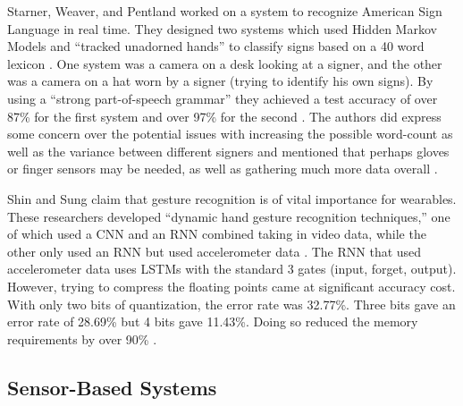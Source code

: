 \documentclass[]{report}
\begin{document}
Starner, Weaver, and Pentland worked on a system to recognize American Sign Language in real time. They designed two systems which used Hidden Markov Models and ``tracked unadorned hands'' to classify signs based on a 40 word lexicon \cite{Starner98}. One system was a camera on a desk looking at a signer, and the other was a camera on a hat worn by a signer (trying to identify his own signs). By using a ``strong part-of-speech grammar'' they achieved a test accuracy of over 87\% for the first system and over 97\% for the second \cite{Starner98}. The authors did express some concern over the potential issues with increasing the possible word-count as well as the variance between different signers and mentioned that perhaps gloves or finger sensors may be needed, as well as gathering much more data overall \cite{Starner98}.

Shin and Sung claim that gesture recognition is of vital importance for wearables. These researchers developed ``dynamic hand gesture recognition techniques,'' one of which used a CNN and an RNN combined taking in video data, while the other only used an RNN but used accelerometer data \cite{ShinS16}. The RNN that used accelerometer data uses LSTMs with the standard 3 gates (input, forget, output). However, trying to compress the floating points came at significant accuracy cost. With only two bits of quantization, the error rate was 32.77\%. Three bits gave an error rate of 28.69\% but 4 bits gave 11.43\%. Doing so reduced the memory requirements by over 90\% \cite{ShinS16}. 

\subsection{Sensor-Based Systems}
\end{document}
